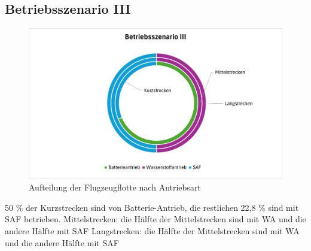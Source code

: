 \subsection{Betriebsszenario III}
\begin{figure}[h]
	\centering
	\includegraphics[width=0.8\linewidth]{Bilder/BetriebsszenarioIII.png}
	\caption[Betriebsszenario III]{Aufteilung der Flugzeugflotte nach Antriebsart}
	\label{betriebsszenario3}
\end{figure}
50 \% der Kurzstrecken sind von Batterie-Antrieb, die restlichen 22,8 \% sind mit SAF betrieben.
Mittelstrecken: die Hälfte der Mittelstrecken sind mit WA und die andere Hälfte mit SAF
Langstrecken: die Hälfte der Mittelstrecken sind mit WA und die andere Hälfte mit SAF